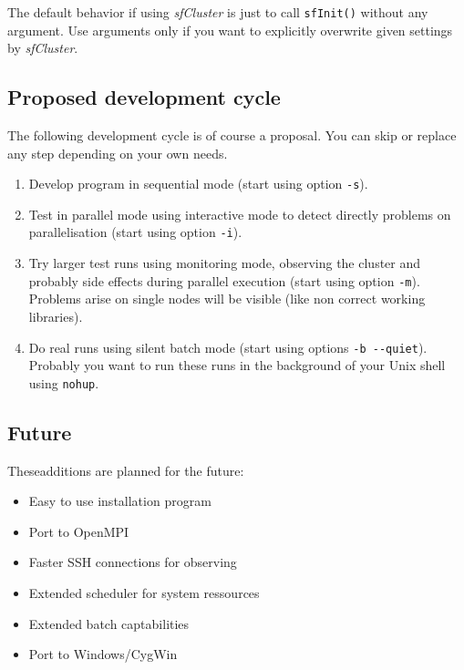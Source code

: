 \documentclass[10pt,oneside]{article}
\begin{document}
The default behavior if using \emph{sfCluster} is just to call \texttt{sfInit()}
without any argument. Use arguments only if you want to explicitly overwrite
given settings by \emph{sfCluster}.

\subsection{Proposed development cycle}
The following development cycle is of course a proposal. You can skip
or replace any step depending on your own needs.

\begin{enumerate}
\item
Develop program in sequential mode (start using option \texttt{-s}).
\item
Test in parallel mode using interactive mode to detect directly problems
on parallelisation (start using option \texttt{-i}).
\item
Try larger test runs using monitoring mode, observing the cluster and
probably side effects during parallel execution
(start using option \texttt{-m}). Problems arise on single nodes
will be visible (like non correct working libraries).
\item
Do real runs using silent batch mode (start using options
\texttt{-b {-}{-}quiet}). Probably you want to run these runs in the
background of your Unix shell using \texttt{nohup}.
\end{enumerate}\subsection{Future}

Theseadditions are planned for the future:

\begin{itemize}
\item Easy to use installation program
\item Port to OpenMPI
\item Faster SSH connections for observing
\item Extended scheduler for system ressources
\item Extended batch captabilities
\item Port to Windows/CygWin
\end{itemize}


\end{document}
